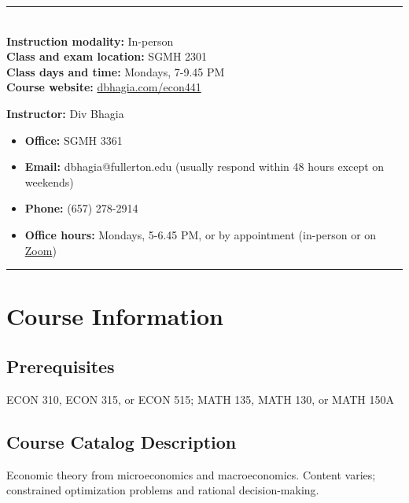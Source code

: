 \documentclass{./../Latex/syllabus}
\begin{document}


\vspace{-1.5em}
\begin{center}
\begin{minipage}[t]{\textwidth}
\rule{\textwidth}{0.5pt} \\
\textbf{Instruction modality:} In-person \\
\textbf{Class and exam location:} SGMH 2301 \\
\textbf{Class days and time:} Mondays, 7-9.45 PM  \\
\textbf{Course website:} \href{https://www.dbhagia.com/econ441/}{dbhagia.com/econ441}  \\ \vspace{-0.5em}


\textbf{Instructor:} Div Bhagia \vspace{-0.25em}
\begin{itemize}
\item[] \textbf{Office:} SGMH 3361 
\item[] \textbf{Email:} dbhagia@fullerton.edu (usually respond within 48 hours except on weekends)
\item[] \textbf{Phone:} (657) 278-2914 
\item[] \textbf{Office hours:} Mondays, 5-6.45 PM, or by appointment (in-person or on \href{https://fullerton.zoom.us/j/81895171931}{Zoom}) 
\end{itemize}
\rule{\textwidth}{0.5pt} 
\end{minipage}
\end{center}


\section*{Course Information}

\subsection*{Prerequisites}
ECON 310, ECON 315, or ECON 515; MATH 135, MATH 130, or MATH 150A

\subsection*{Course Catalog Description}
Economic theory from microeconomics and macroeconomics. Content varies; constrained optimization problems and rational decision-making.
\end{document}
